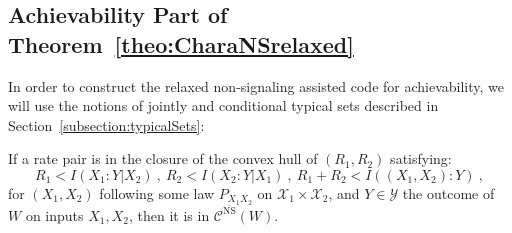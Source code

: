       \subsection{Achievability Part of Theorem~\ref{theo:CharaNSrelaxed}}
      In order to construct the relaxed non-signaling assisted code for achievability, we will use the notions of jointly and conditional typical sets described in Section~\ref{subsection:typicalSets}:
  \begin{proposition}      
      \label{prop:AchievabilityNSrelaxed}
      If a rate pair is in the closure of the convex hull of $(R_1,R_2)$ satisfying:
      \[ R_1 < I(X_1:Y|X_2)\ ,\ R_2 < I(X_2:Y|X_1)\ ,\ R_1+R_2 < I((X_1,X_2):Y) \ ,\]
      for $(X_1,X_2)$ following some law $P_{X_1X_2}$ on $\mathcal{X}_1 \times \mathcal{X}_2$, and $Y \in \mathcal{Y}$ the outcome of $W$ on inputs $X_1,X_2$, then it is in $\mathcal{C}^{\overline{\mathrm{NS}}}(W)$.
  \end{proposition}
